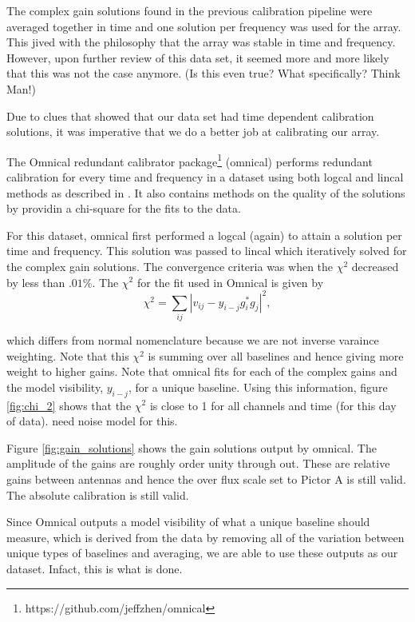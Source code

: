 \documentclass[twocolumn,numberedappendix]{emulateapj}
\begin{document}
The complex gain solutions found in the previous calibration pipeline were
averaged together in time and one solution per frequency was used for the array.
This jived with the philosophy that the array was stable in time and frequency.
However, upon further review of this data set, it seemed more and more likely
that this was not the case anymore. (Is this even true? What specifically? Think
Man!) 

Due to clues that showed that our data set had time dependent calibration
solutions, it was imperative that we do a better job at calibrating our array.

The Omnical redundant calibrator
package\footnote{https://github.com/jeffzhen/omnical} (omnical) performs
redundant calibration for every time and frequency in a dataset using both
logcal and lincal methods as described in \cite{zheng_et_al2014}. It also
contains methods on the quality of the solutions by providin a chi-square for
the fits to the data. 

For this dataset, omnical first performed a logcal (again) to attain a solution
per time and frequency. This solution was passed to lincal which iteratively
solved for the complex gain solutions. The convergence criteria was when the
$\chi^{2}$ decreased by less than $.01\%$. The $\chi^{2}$ for the fit used in
Omnical is given by 
\begin{equation}
    \chi^{2} = \sum_{ij}|v_{ij} - y_{i-j}g_{i}^{*}g_{j}|^{2},
\end{equation}

which differs from normal nomenclature because we are not inverse varaince
weighting. Note that this $\chi^{2}$ is summing over all baselines and hence 
giving more weight to higher gains. Note that omnical fits for each of the
complex gains and the model visibility, $y_{i-j}$,  for a unique baseline.
Using this information, figure \ref{fig:chi_2} shows that the $\chi^{2}$ is close
to 1 for all channels and time (for this day of data). need noise model for
this.

Figure \ref{fig:gain_solutions} shows the gain solutions output by omnical. The
amplitude of the gains are roughly order unity through out. These are relative
gains between antennas and hence the over flux scale set to Pictor A is still
valid. The absolute calibration is still valid. 

Since Omnical outputs a model visibility of what a unique baseline should
measure, which is derived from the data by removing all of the variation between
unique types of baselines and averaging, we are able to use these outputs as our
dataset. Infact, this is what is done. 
%
\end{document}
